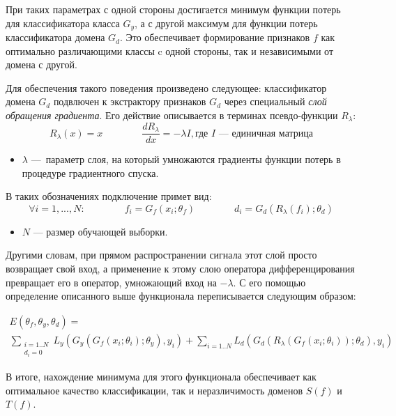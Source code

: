 \documentclass[14pt, a4paper]{extarticle}
\begin{document}
При таких параметрах с одной стороны достигается минимум функции потерь для классификатора класса $G_y$, а с другой максимум для функции потерь классификатора домена $G_d$. Это обеспечивает формирование признаков $f$ как оптимально различающими классы c одной стороны, так и независимыми от домена с другой.

Для обеспечения такого поведения произведено следующее: классификатор домена $G_d$ подвлючен к экстрактору признаков $G_d$ через специальный \textit{слой обращения градиента}. Его действие описывается в терминах псевдо-функции $R_{\lambda}$:
\begin{equation*}
	R_{\lambda}(x) = x \quad \quad \quad \quad
	\frac{dR_{\lambda}}{dx} = -\lambda I, \text{где $I$ — единичная матрица}
\end{equation*}
\begin{itemize}
	\item $\lambda$ — параметр слоя, на который умножаются градиенты функции потерь в процедуре градиентного спуска.
\end{itemize}
В таких обозначениях подключение примет вид:
\begin{equation*}
\forall i = 1, ..., N: \quad \quad \quad \quad
f_i = G_f(x_i; \theta_f) \quad \quad \quad \quad
d_i = G_d(R_{\lambda}(f_i); \theta_d)	
\end{equation*}
\begin{itemize}
	\item $N$ — размер обучающей выборки.
\end{itemize}

Другими словам, при прямом распространении сигнала этот слой просто возвращает свой вход, а применение к этому слою оператора дифференцирования превращает его в оператор, умножающий вход на $-\lambda$. С его помощью определение описанного выше функционала переписывается следующим образом:

\begin{equation*}\label{E}
\begin{gathered}
E(\theta_f, \theta_y, \theta_d) = \\ \sum_{ \substack{i=1..N \\ d_i=0} }L_y(G_y(G_f(x_i; \theta_i); \theta_y), y_i) + \sum_{ i=1..N } L_d(G_d(R_{\lambda}(G_f(x_i; \theta_i)); \theta_d), y_i)
\end{gathered}
\end{equation*}

В итоге, нахождение минимума для этого функционала обеспечивает как оптимальное качество классификации, так и неразличимость доменов $S(f)$ и $T(f)$.
\end{document}
